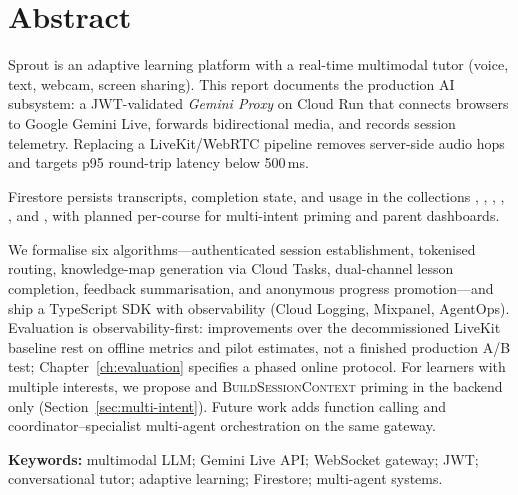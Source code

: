 \chapter*{Abstract}

\begin{sloppypar}
Sprout is an adaptive learning platform with a real-time multimodal tutor (voice, text, webcam, screen sharing). This report documents the production AI subsystem: a JWT-validated \emph{Gemini Proxy} on Cloud Run that connects browsers to Google Gemini Live, forwards bidirectional media, and records session telemetry. Replacing a LiveKit/WebRTC pipeline removes server-side audio hops and targets p95 round-trip latency below 500\,ms.

Firestore persists transcripts, completion state, and usage in the collections , , , , , and , with planned per-course  for multi-intent priming and parent dashboards.

We formalise six algorithms---authenticated session establishment, tokenised routing, knowledge-map generation via Cloud Tasks, dual-channel lesson completion, feedback summarisation, and anonymous progress promotion---and ship a TypeScript SDK with observability (Cloud Logging, Mixpanel, AgentOps). Evaluation is observability-first: improvements over the decommissioned LiveKit baseline rest on offline metrics and pilot estimates, not a finished production A/B test; Chapter~\ref{ch:evaluation} specifies a phased online protocol. For learners with multiple interests, we propose  and \textsc{BuildSessionContext} priming in the backend only (Section~\ref{sec:multi-intent}). Future work adds function calling and coordinator--specialist multi-agent orchestration on the same gateway.
\end{sloppypar}

\noindent\textbf{Keywords:} multimodal LLM; Gemini Live API; WebSocket gateway; JWT; conversational tutor; adaptive learning; Firestore; multi-agent systems.
